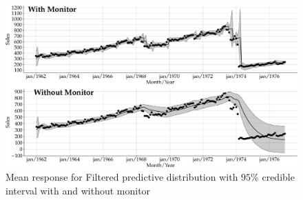 \documentclass[
]{article}
\begin{document}
\begin{figure}

{\centering \includegraphics[width=0.9\linewidth]{pybats_detection_files/figure-latex/plot-fit-cp6-filter-monitor-1} 

}

\caption{Mean response for Filtered predictive distribution with $95\%$ credible interval with and without monitor}\label{fig:plot-fit-cp6-filter-monitor}
\end{figure}
\end{document}
